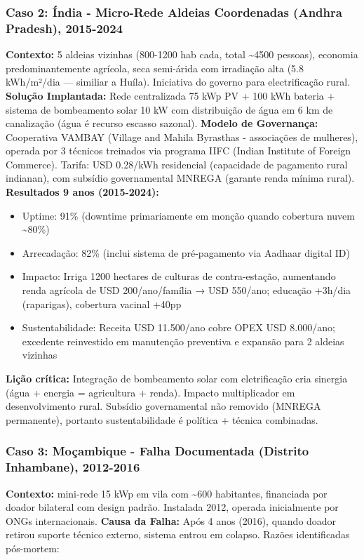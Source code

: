 \documentclass[12pt, a4paper]{article}
\begin{document}
\subsubsection{Caso 2: Índia - Micro-Rede Aldeias Coordenadas (Andhra Pradesh), 2015-2024}
\textbf{Contexto:} 5 aldeias vizinhas (800-1200 hab cada, total \textasciitilde{}4500 pessoas), economia predominantemente agrícola, seca semi-árida com irradiação alta (5.8 kWh/m²/dia — similiar a Huíla). Iniciativa do governo para electrificação rural.
\textbf{Solução Implantada:} Rede centralizada 75 kWp PV + 100 kWh bateria + sistema de bombeamento solar 10 kW com distribuição de água em 6 km de canalização (água é recurso escasso sazonal).
\textbf{Modelo de Governança:} Cooperativa VAMBAY (Village and Mahila Byrasthas - associações de mulheres), operada por 3 técnicos treinados via programa IIFC (Indian Institute of Foreign Commerce). Tarifa: USD 0.28/kWh residencial (capacidade de pagamento rural indianan), com subsídio governamental MNREGA (garante renda mínima rural).
\textbf{Resultados 9 anos (2015-2024):}
\begin{itemize}
\item Uptime: 91\% (downtime primariamente em monção quando cobertura nuvem \textasciitilde{}80\%)
\item Arrecadação: 82\% (inclui sistema de pré-pagamento via Aadhaar digital ID)
\item Impacto: Irriga 1200 hectares de culturas de contra-estação, aumentando renda agrícola de USD 200/ano/família → USD 550/ano; educação +3h/dia (raparigas), cobertura vacinal +40pp
\item Sustentabilidade: Receita USD 11.500/ano cobre OPEX USD 8.000/ano; excedente reinvestido em manutenção preventiva e expansão para 2 aldeias vizinhas
\end{itemize}\textbf{Lição crítica:} Integração de bombeamento solar com eletrificação cria sinergia (água + energia = agricultura + renda). Impacto multiplicador em desenvolvimento rural. Subsídio governamental não removido (MNREGA permanente), portanto sustentabilidade é política + técnica combinadas.

\subsubsection{Caso 3: Moçambique - Falha Documentada (Distrito Inhambane), 2012-2016}
\textbf{Contexto:} mini-rede 15 kWp em vila com \textasciitilde{}600 habitantes, financiada por doador bilateral com design padrão. Instalada 2012, operada inicialmente por ONGs internacionais.
\textbf{Causa da Falha:} Após 4 anos (2016), quando doador retirou suporte técnico externo, sistema entrou em colapso. Razões identificadas pós-mortem:
\end{document}
